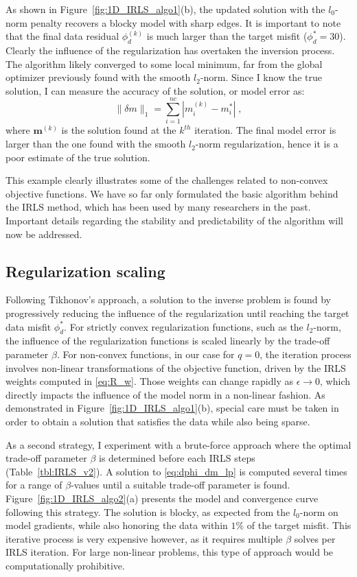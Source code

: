 As shown in Figure~\ref{fig:1D_IRLS_algo1}(b), the updated solution with the $l_0$-norm penalty recovers a blocky model with sharp edges. 
It is important to note that the final data residual $\phi_d^{(k)}$ is much larger than the target misfit ($\phi_d^*=30$).
Clearly the influence of the regularization has overtaken the inversion process.
The algorithm likely converged to some local minimum, far from the global optimizer previously found with the smooth $l_2$-norm.
Since I know the true solution, I can measure the accuracy of the solution, or model error as:
\begin{equation}
\| \delta m \|_1 = \sum_{i = 1}^{nc} |m_i^{(k)} - m_i^*| \;,
\end{equation}
where $\mathbf{m}^{(k)}$ is the solution found at the $k^{th}$ iteration.
The final model error is larger than the one found with the smooth $l_2$-norm regularization, hence it is a poor estimate of the true solution.

This example clearly illustrates some of the challenges related to non-convex objective functions.
We have so far only formulated the basic algorithm behind the IRLS method, which has been used by many researchers in the past.
Important details regarding the stability and predictability of the algorithm will now be addressed.

\subsection{Regularization scaling}
Following Tikhonov's approach, a solution to the inverse problem is found by progressively reducing the influence of the regularization until reaching the target data misfit $\phi_d^*$. 
For strictly convex regularization functions, such as the $l_2$-norm, the influence of the regularization functions is scaled linearly by the trade-off  parameter $\beta$. 
For non-convex functions, in our case for $q = 0$, the iteration process involves non-linear transformations of the objective function, driven by the IRLS weights computed in \eqref{eq:R_w}. 
Those weights can change rapidly as $\epsilon \rightarrow 0$, which directly impacts the influence of the model norm in a non-linear fashion. 
As demonstrated in Figure~\ref{fig:1D_IRLS_algo1}(b), special care must be taken in order to obtain a solution that satisfies the data while also being sparse.

As a second strategy, I experiment with a brute-force approach where the optimal trade-off parameter $\beta$ is determined before each IRLS steps (Table~\ref{tbl:IRLS_v2}).
A solution to \ref{eq:dphi_dm_lp} is computed several times for a range of $\beta$-values until a suitable trade-off parameter is found.
Figure~\ref{fig:1D_IRLS_algo2}(a) presents the model and convergence curve following this strategy.
The solution is blocky, as expected from the $l_0$-norm on model gradients, while also honoring the data within $1\%$ of the target misfit.
This iterative process is very expensive however, as it requires multiple $\beta$ solves per IRLS iteration.
For large non-linear problems, this type of approach would be computationally prohibitive.

